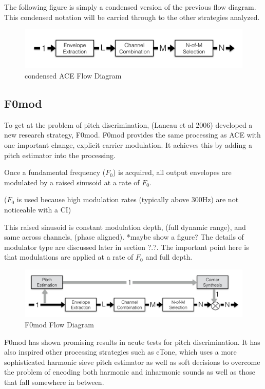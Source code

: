 \documentclass [11pt, proquest] {uwthesis}[2015/03/03]
\begin{document}
The following figure is simply a condensed version of the previous flow diagram.  This condensed notation will be carried through to the other strategies analyzed.

\begin{figure}[!ht]
  \centering
    \includegraphics[width=1\textwidth]{ACE_flow_diagramTEMP}   
    \caption{condensed ACE Flow Diagram}
\end{figure}

\subsection{F0mod}

To get at the problem of pitch discrimination, (Laneau et al 2006) developed a new research strategy, F0mod.  F0mod provides the same processing as ACE with one important change, explicit carrier modulation.  It achieves this by adding a pitch estimator into the processing.

Once a fundamental frequency ($F_0$) is acquired, all output envelopes are modulated by a raised sinusoid at a rate of $F_0$.  

($F_0$ is used because high modulation rates (typically above 300Hz) are not noticeable with a CI)

This raised sinusoid is constant modulation depth, (full dynamic range), and same across channels, (phase aligned).  *maybe show a figure?  The details of modulator type are discussed later in section ?.?.  The important point here is that modulations are applied at a rate of $F_0$ and full depth.

\begin{figure}[!ht]
  \centering
    \includegraphics[width=1\textwidth]{F0mod_flow_diagramTEMP}   
    \caption{F0mod Flow Diagram}
\end{figure}

F0mod has shown promising results in acute tests for pitch discrimination.  It has also inspired other processing strategies such as eTone, which uses a more sophisticated harmonic sieve pitch estimator as well as soft decisions to overcome the problem of encoding both harmonic and inharmonic sounds as well as those that fall somewhere in between.
\end{document}

